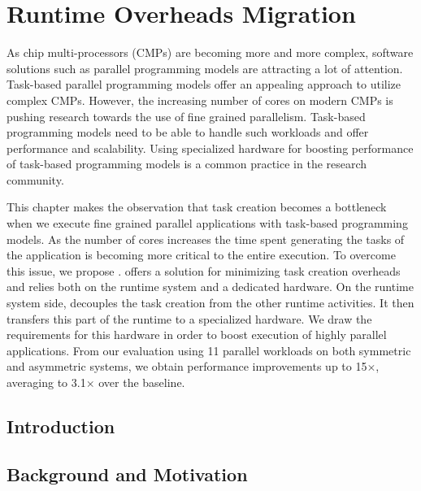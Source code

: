 
\chapter{Runtime Overheads Migration}
\label{chapter.taskgenx}
As chip multi-processors (CMPs) are becoming more and more complex, software solutions such as parallel programming models are attracting a lot of attention.
Task-based parallel programming models offer an appealing approach to utilize complex CMPs.
However, the increasing number of cores on modern CMPs is pushing research towards the use of fine grained parallelism.
Task-based programming models need to be able to handle such workloads and offer performance and scalability.
Using specialized hardware for boosting performance of task-based programming models is a common practice in the research community.

This chapter makes the observation that task creation becomes a bottleneck when we execute fine grained parallel applications with task-based programming models.
As the number of cores increases the time spent generating the tasks of the application is becoming more critical to the entire execution.
To overcome this issue, we propose {\proposal}.
{\proposal} offers a solution for minimizing task creation overheads and relies both on the runtime system and a dedicated hardware.
On the runtime system side, {\proposal} decouples the task creation from the other runtime activities.
It then transfers this part of the runtime to a specialized hardware.
We draw the requirements for this hardware in order to boost execution of highly parallel applications.
From our evaluation using 11 parallel workloads on both symmetric and asymmetric systems, we obtain performance improvements up to 15$\times$, averaging to 3.1$\times$ over the baseline.
\newpage

\section{Introduction}
\label{sec:intro}



\section{Background and Motivation}
\label{sec.taskgenx.background}


